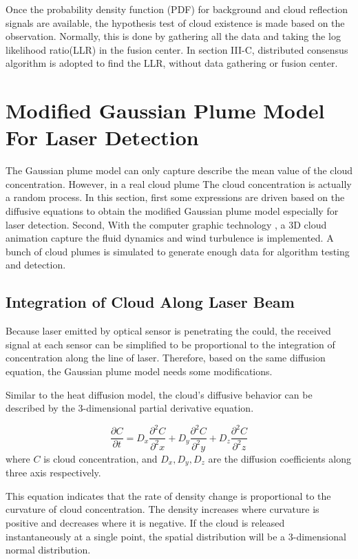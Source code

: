 Once the probability density function (PDF) for background and cloud
reflection signals are available, the hypothesis test of cloud existence
is made based on the observation. Normally, this is done by gathering
all the data and taking the log likelihood ratio(LLR) in the fusion
center. In section III-C, distributed consensus algorithm is adopted
to find the LLR, without data gathering or fusion center.


\section{\label{sub:Modified-Gaussian-Plume}Modified Gaussian Plume Model
For Laser Detection}

The Gaussian plume model can only capture describe the mean value
of the cloud concentration. However, in a real cloud plume The cloud
concentration is actually a random process. In this section, first
some expressions are driven based on the diffusive equations to obtain
the modified Gaussian plume model especially for laser detection.
Second, With the computer graphic technology \cite{He2011}, a 3D
cloud animation capture the fluid dynamics and wind turbulence is
implemented. A bunch of cloud plumes is simulated to generate enough
data for algorithm testing and detection.


\subsection{Integration of Cloud Along Laser Beam}

Because laser emitted by optical sensor is penetrating the could,
the received signal at each sensor can be simplified to be proportional
to the integration of concentration along the line of laser. Therefore,
based on the same diffusion equation, the Gaussian plume model needs
some modifications. 

Similar to the heat diffusion model, the cloud's diffusive behavior
can be described by the 3-dimensional partial derivative equation. 

\begin{equation}
\frac{\partial C}{\partial t}=D_{x}\frac{\partial^{2}C}{\partial^{2}x}+D_{y}\frac{\partial^{2}C}{\partial^{2}y}+D_{z}\frac{\partial^{2}C}{\partial^{2}z}\label{eq:3D diffusion Eq.}
\end{equation}
where $C$ is cloud concentration, and $D_{x},D_{y},D_{z}$ are the
diffusion coefficients along three axis respectively. 

This equation indicates that the rate of density change is proportional
to the curvature of cloud concentration. The density increases where
curvature is positive and decreases where it is negative. If the cloud
is released instantaneously at a single point, the spatial distribution
will be a 3-dimensional normal distribution.

